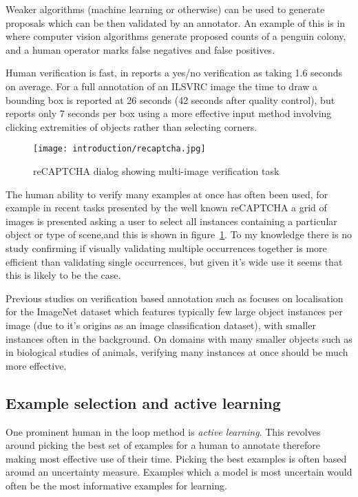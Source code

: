 Weaker algorithms (machine learning or otherwise) can be used to generate proposals which can be then validated by an annotator. An example of this is in \cite{McNeill2011} where computer vision algorithms generate proposed counts of a penguin colony, and a human operator marks false negatives and false positives.

Human verification is fast, in \cite{Papadopoulos2016} reports a yes/no verification as taking 1.6 seconds on average. For a full annotation of an \gls{ILSVRC} image \cite {Su2012a} the time to draw a bounding box is reported at 26 seconds (42 seconds after quality control), but \cite{Papadopoulos2017} reports only 7 seconds per box using a more effective input method involving clicking extremities of objects rather than selecting corners. 

\begin{figure}[h]
  \centering
  \texttt{[image: introduction/recaptcha.jpg]}
  \caption{reCAPTCHA dialog showing multi-image verification task}  
  \label{fig:captcha}
\end{figure}

The human ability to verify many examples at once has often been used, for example in recent tasks presented by the well known reCAPTCHA \cite{von2008recaptcha} a grid of images is presented asking a user to select all instances containing a particular object or type of scene,and this is shown in figure~\ref{fig:captcha}. To my knowledge there is no study confirming if visually validating multiple occurrences together is more efficient than validating single occurrences, but given it's wide use it seems that this is likely to be the case. 

Previous studies on verification based annotation such as \cite{Papadopoulos2016} focuses on localisation for the ImageNet dataset which features typically few large object instances per image (due to it's origins as an image classification dataset), with smaller instances often in the background. On domains with many smaller objects such as in biological studies of animals, verifying many instances at once should be much more effective. 


\subsection{Example selection and active learning} 

One prominent human in the loop method is \emph{active learning}. This revolves around picking the best set of examples for a human to annotate therefore making most effective use of their time. Picking the best examples is often based around an uncertainty measure. Examples which a model is most uncertain would often be the most informative examples for learning. 
 
